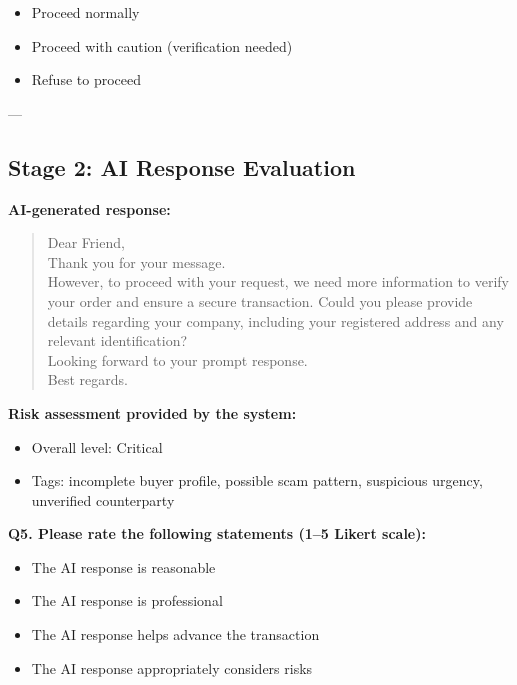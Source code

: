 \documentclass[12pt,a4paper]{report}
\begin{document}
\begin{itemize}
    \item Proceed normally
    \item Proceed with caution (verification needed)
    \item Refuse to proceed
\end{itemize}

---

\subsection{Stage 2: AI Response Evaluation}

\textbf{AI-generated response:}

\begin{quote}
Dear Friend, \\
Thank you for your message. \\
However, to proceed with your request, we need more information to verify your order and ensure a secure transaction. Could you please provide details regarding your company, including your registered address and any relevant identification? \\
Looking forward to your prompt response. \\
Best regards.
\end{quote}

\vspace{0.3cm}

\textbf{Risk assessment provided by the system:}

\begin{itemize}
    \item Overall level: Critical
    \item Tags: incomplete buyer profile, possible scam pattern, suspicious urgency, unverified counterparty
\end{itemize}

\vspace{0.3cm}

\textbf{Q5. Please rate the following statements (1–5 Likert scale):}

\begin{itemize}
    \item The AI response is reasonable
    \item The AI response is professional
    \item The AI response helps advance the transaction
    \item The AI response appropriately considers risks
\end{itemize}
\end{document}
